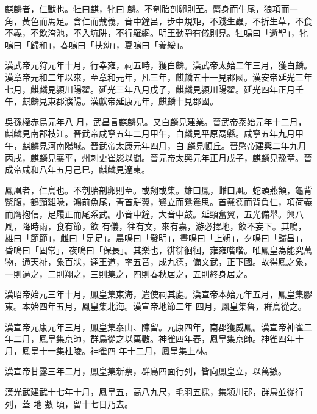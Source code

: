 
\begin{pinyinscope}

 麒麟者，仁獸也。牡曰麒，牝曰
 麟。不刳胎剖卵則至。麕身而牛尾，狼項而一角，黃色而馬足。含仁而戴義，音中鐘呂，步中規矩，不踐生蟲，不折生草，不食不義，不飲洿池，不入坑阱，不行羅網。明王動靜有儀則見。牡鳴曰「逝聖」，牝鳴曰「歸和」，春鳴曰「扶幼」，夏鳴曰「養綏」。



 漢武帝元狩元年十月，行幸雍，祠五畤，獲白麟。漢武帝太始二年三月，獲白麟。漢章帝元和二年以來，至章和元年，凡三年，麒麟五十一見郡國。漢安帝延光三年七月，麒麟見潁川陽翟。延光三年八月戊子，麒麟見潁川陽翟。延光四年正月壬午，麒麟見東郡濮陽。漢獻帝延康元年，麒麟十見郡國。



 吳孫權赤烏元年八
 月，武昌言麒麟見。又白麟見建業。晉武帝泰始元年十二月，麒麟見南郡枝江。晉武帝咸寧五年二月甲午，白麟見平原鬲縣。咸寧五年九月甲午，麒麟見河南陽城。晉武帝太康元年四月，白
 麟見頓丘。晉愍帝建興二年九月丙戌，麒麟見襄平，州刺史崔毖以聞。晉元帝太興元年正月戊子，麒麟見豫章。晉成帝咸和八年五月己巳，麒麟見遼東。



 鳳凰者，仁鳥也。不刳胎剖卵則至。或翔或集。雄曰鳳，雌曰凰。蛇頭燕頷，龜背鱉腹，鶴頸雞喙，鴻前魚尾，青首駢翼，鷺立而鴛鴦思。首戴德而背負仁，項荷義而膺抱信，足履正而尾系武。小音中鐘，大音中鼓。延頸奮翼，五光備舉。興八風，降時雨，食有節，飲
 有儀，往有文，來有嘉，游必擇地，飲不妄下。其鳴，雄曰「節節」，雌曰「足足」。晨鳴曰「發明」，晝鳴曰「上朔」，夕鳴曰「歸昌」，昏鳴曰「固常」，夜鳴曰「保長」。其樂也，徘徘徊徊，雍雍喈喈。唯鳳皇為能究萬物，通天祉，象百狀，達王道，率五音，成九德，備文武，正下國。故得鳳之象，一則過之，二則翔之，三則集之，四則春秋居之，五則終身居之。



 漢昭帝始元三年十月，鳳皇集東海，遣使祠其處。漢宣帝本始元年五月，鳳皇集膠東。本始四年五月，鳳皇集北海。漢宣帝地節二年
 四月，鳳皇集魯，群鳥從之。



 漢宣帝元康元年三月，鳳皇集泰山、陳留。元康四年，南郡獲威鳳。漢宣帝神雀二年二月，鳳皇集京師，群鳥從之以萬數。神雀四年春，鳳皇集京師。神雀四年十月，鳳皇十一集杜陵。神雀四
 年十二月，鳳皇集上林。



 漢宣帝甘露三年二月，鳳皇集新蔡，群鳥四面行列，皆向鳳皇立，以萬數。



 漢光武建武十七年十月，鳳皇五，高八九尺，毛羽五採，集潁川郡，群鳥並從行列，蓋
 地
 數
 頃，留十七日乃去。




\end{pinyinscope}
